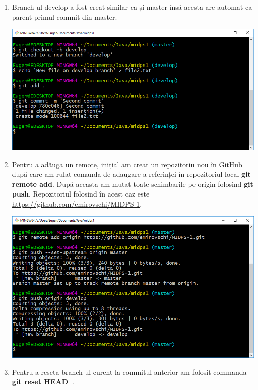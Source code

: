 \begin{enumerate}
\item Branch-ul develop a fost creat similar ca și master însă acesta are automat ca parent primul commit din master.

\begin{minipage}{\linewidth}
	\centering
	\includegraphics[width=17cm]{04developBranch}
\end{minipage}
\break

\item Pentru a adăuga un remote, inițial am creat un repozitoriu nou în GitHub după care am rulat comanda de adaugare a referinței în repozitoriul local \textbf{git remote add}. După aceasta am mutat toate schimbarile pe origin folosind \textbf{git push}. Repozitoriul folosind în acest caz este \url{https://github.com/emirovschi/MIDPS-1}.

\begin{minipage}{\linewidth}
	\centering
	\includegraphics[width=17cm]{05remote}
\end{minipage}
\break

\item Pentru a reseta branch-ul curent la commitul anterior am folosit commanda \textbf{git reset HEAD~}.


\end{enumerate}
